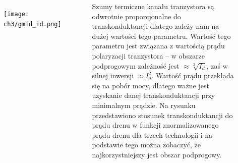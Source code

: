 \begin{frame}[t]
    \begin{block}{\dk}
    \end{block}
    \begin{columns}
        \begin{figure}[H]
            \texttt{[image: ch3/gmid\_id.png]} 
        \end{figure}
    
        Szumy termiczne kanału tranzystora są odwrotnie proporcjonalne do transkonduktancji dlatego zależy nam na dużej wartości tego parametru. 
        Wartość tego parametru jest związana z wartością prądu polaryzacji tranzystora -- w obszarze podprogowym zależność jest $\approx\sqrt[2]{I_d}$, zaś w silnej inwersji $\approx I_d^2$.
        Wartość prądu przekłada się na pobór mocy, dlatego ważne jest uzyskanie danej transkonduktancji przy minimalnym prądzie. 
        Na rysunku przedstawiono stosunek transkonduktancji do prądu drenu w funkcji znormalizowanego prądu drenu dla trzech technologii i na podstawie tego można zobaczyć, że najkorzystniejszy jest obszar podprogowy.
     \end{columns}
\end{frame}

